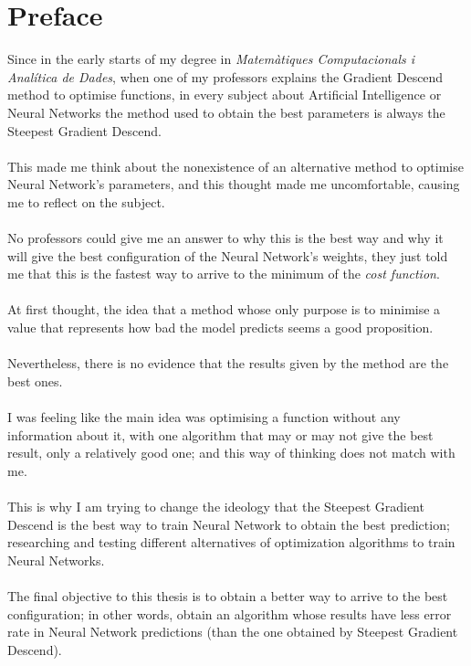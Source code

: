 \documentclass[a4paper, 11pt]{article}
\begin{document}
\section*{Preface}
Since in the early starts of my degree in \textit{Matemàtiques Computacionals i Analítica de Dades}, when one of my professors explains the Gradient Descend method to optimise functions, in every subject about Artificial Intelligence or Neural Networks the method used to obtain the best parameters is always the Steepest Gradient Descend.\\\\
This made me think about the nonexistence of an alternative method to optimise Neural Network's parameters, and this thought made me uncomfortable, causing me to reflect on the subject.\\\\
No professors could give me an answer to why this is the best way and why it will give the best configuration of the Neural Network's weights, they just told me that this is the fastest way to arrive to the minimum of the \textit{cost function}.\\\\
At first thought, the idea that a method whose only purpose is to minimise a value that represents how bad the model predicts seems a good proposition.\\\\
Nevertheless, there is no evidence that the results given by the method are the best ones. \\\\
I was feeling like the main idea was optimising a function without any information about it, with one algorithm that may or may not give the best result, only a relatively good one; and this way of thinking does not match with me.\\\\
This is why I am trying to change the ideology that the Steepest Gradient Descend is the best way to train Neural Network to obtain the best prediction; researching and testing different alternatives of optimization algorithms to train Neural Networks.\\\\
The final objective to this thesis is to obtain a better way to arrive to the best configuration; in other words, obtain an algorithm whose results have less error rate in Neural Network predictions (than the one obtained by Steepest Gradient Descend).


\newpage
{}
\end{document}
